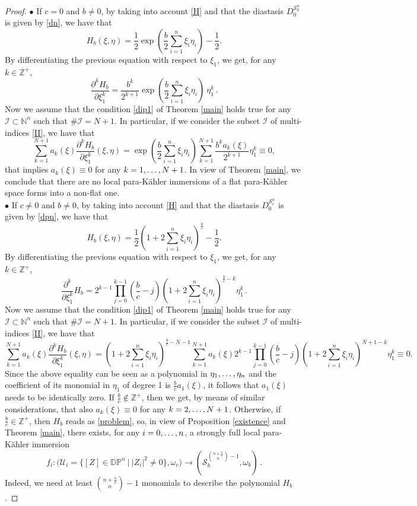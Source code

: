 \documentclass[10pt,a4paper]{amsart}
\newcommand{\DP}{\mathds{D}\mathds{P}}
\newcommand{\I}{\mathcal{I}}
\newcommand{\N}{\mathds{N}}
\newcommand{\Z}{\mathds{Z}}
\newcommand{\de}{\partial}
\newcommand{\pk}{para-K\"ahler }
\newcommand{\s}{\mathcal{S}}
\begin{document}
\begin{proof}
\medskip
\noindent
$\bullet$ 
If $c=0$ and $b\neq 0$, by taking into account   \eqref{H} and that the diastasis $D_0^{\s_0^n}$ is given by \eqref{dn}, we have that
$$ H_b(\xi,\eta)= \frac{1}{2}\exp\left( \frac{b}{2}\sum_{i=1}^n \xi_i\eta_i \right)-\frac{1}{2}.$$
By differentiating the previous equation with respect to  $\xi_1$, we get, for any $k\in\Z^+$,
$$\frac{\de^k H_b}{\de \xi_1^{k}}=\frac{b^k}{2^{k+1}}\exp\left( \frac{b}{2}\sum_{i=1}^n \xi_i\eta_i \right)\ \eta_1^k\,. $$
Now we assume that the condition \eqref{dip1} of Theorem \ref{main} holds true for any  $\I\subset \N^n$ such that $\#\I=N+1$. In particular, if we consider the subset $\I$ of multi-indices \eqref{II}, we have that
$$\sum_{k=1}^{N+1} a_k(\xi) \frac{\de^k H_b}{\de \xi_1^{k}}(\xi,\eta)= \exp\left( \frac{b}{2}\sum_{i=1}^n \xi_i\eta_i \right) \sum_{k=1}^{N+1}\frac{b^k  a_k(\xi) }{2^{k+1}} \eta_1^k \equiv 0,$$
that implies $a_k(\xi)\equiv 0$ for any  $k=1,\mathellipsis,N+1$.
In view of  Theorem  \ref{main}, we  conclude that there are no local \pk immersions of a flat \pk space forms into a non-flat one.\\


\medskip
\noindent
$\bullet$ 
If $c\neq 0$ and $b\neq 0$, by taking into account   \eqref{H} and that the diastasis $D_0^{\s_c^n}$ is given by \eqref{dpn}, we have that
$$ H_b(\xi,\eta)= \frac{1}{2}\left(1+2\sum_{i=1}^n \xi_i\eta_i\right)^\frac{b}{c}-\frac{1}{2}.$$
By differentiating the previous equation with respect to  $\xi_1$, we get, for any $k\in\Z^+$,
$$\frac{\de^k}{\de \xi_1^{k}} H_b= 
2^{k-1} \prod_{j=0}^{k-1}\left(\frac{b}{c}-j\right)\left(1+2\sum_{i=1}^n \xi_i\eta_i\right)^{\frac{b}{c} -k}\eta_1^k\,.$$
Now we assume that the condition \eqref{dip1} of Theorem \ref{main} holds true for any  $\I\subset \N^n$ such that $\#\I=N+1$. In particular, if we consider the subset $\I$ of multi-indices \eqref{II}, we have that
$$\sum_{k=1}^{N+1} a_k(\xi) \frac{\de^k H_b}{\de \xi_1^{k}}(\xi,\eta)=\left(1+2\sum_{i=1}^n \xi_i\eta_i\right)^{\frac{b}{c} -N-1}
\sum_{k=1}^{N+1} a_k(\xi) 2^{k-1} \prod_{j=0}^{k-1}\left(\frac{b}{c}-j\right)\left(1+2\sum_{i=1}^n \xi_i\eta_i\right)^{N+1 -k}\eta_1^k \equiv 0.$$
Since the above equality can be seen as a polynomial in $\eta_1,\mathellipsis,\eta_n$ and the coefficient of its monomial in $\eta_1$ of degree 1 is $\frac{b}{c}a_1(\xi)$, it follows that $a_1(\xi)$ needs to be identically zero.
If $\frac{b}{c}\not\in\Z^+$, then we get, by means of similar considerations, that also $a_k(\xi)\equiv 0$ for any  $k=2,\mathellipsis,N+1$. Otherwise, if $\frac{b}{c}\in\Z^+$, then $H_b$ reads as \eqref{problem}, so, in view of Proposition \ref{existence} and Theorem \ref{main}, there exists, for any $i=0,\mathellipsis,n$,
a strongly full local \pk immersion 
$$f_i:\big( \mathcal{U}_i=\{[Z]\in\DP^n\ | \ |Z_i|^2\neq0\},\omega_c\big) \to \left(\s_b^{\binom{n+\frac{b}{c}}{n}-1},\omega_b\right)\,.$$
Indeed, we need at least $\binom{n+\frac{b}{c}}{n}-1$ monomials to describe the polynomial $H_b$.


\end{proof}
\end{document}
